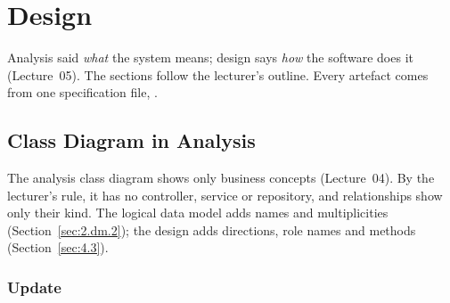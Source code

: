 \chapter{Design}\label{ch:design}
\providecommand{\schemaPath}{demo/db/ecom\_schema\_sqlite.sql}

Analysis said \emph{what} the system means; design says \emph{how} the software does it (Lecture~05). The sections
follow the lecturer's outline. Every artefact comes from one specification file, .

\section{Class Diagram in Analysis}\label{sec:4.1}

The analysis class diagram shows only business concepts (Lecture~04). By the lecturer's rule, it has no controller,
service or repository, and relationships show only their kind. The logical data model adds names and multiplicities
(Section~\ref{sec:2.dm.2}); the design adds directions, role names and methods (Section~\ref{sec:4.3}).

\subsection{Update}\label{sec:4.1.1}

